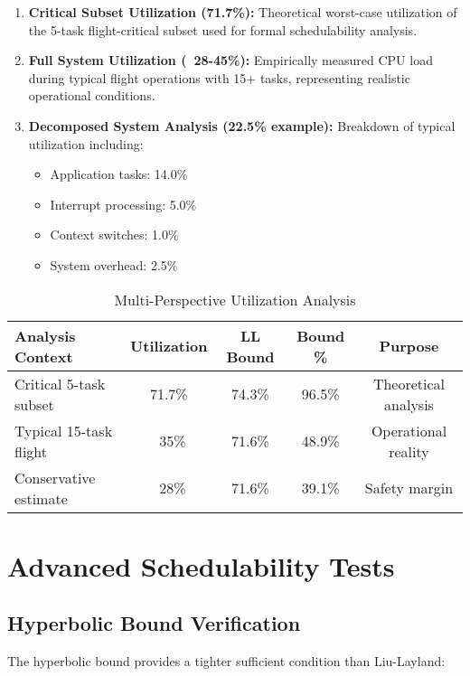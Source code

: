 \documentclass[12pt,a4paper]{article}
\begin{document}
\begin{enumerate}
\item \textbf{Critical Subset Utilization (71.7\%):} Theoretical worst-case utilization of the 5-task flight-critical subset used for formal schedulability analysis.

\item \textbf{Full System Utilization (~28-45\%):} Empirically measured CPU load during typical flight operations with 15+ tasks, representing realistic operational conditions.

\item \textbf{Decomposed System Analysis (22.5\% example):} Breakdown of typical utilization including:
   \begin{itemize}
   \item Application tasks: 14.0\%
   \item Interrupt processing: 5.0\%
   \item Context switches: 1.0\%
   \item System overhead: 2.5\%
   \end{itemize}
\end{enumerate}

\begin{table}[H]
\centering
\begin{tabular}{|l|c|c|c|c|}
\hline
\textbf{Analysis Context} & \textbf{Utilization} & \textbf{LL Bound} & \textbf{Bound \%} & \textbf{Purpose} \\
\hline
Critical 5-task subset & 71.7\% & 74.3\% & 96.5\% & Theoretical analysis \\
Typical 15-task flight & ~35\% & 71.6\% & 48.9\% & Operational reality \\
Conservative estimate & ~28\% & 71.6\% & 39.1\% & Safety margin \\
\hline
\end{tabular}
\caption{Multi-Perspective Utilization Analysis}
\end{table}

\section{Advanced Schedulability Tests}

\subsection{Hyperbolic Bound Verification}

The hyperbolic bound provides a tighter sufficient condition than Liu-Layland:
\end{document}
